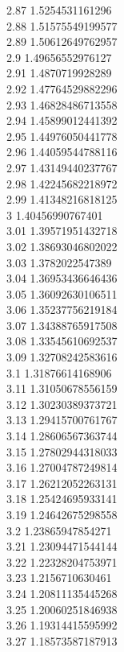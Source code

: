 {2.87	1.5254531161296\\
2.88	1.51575549199577\\
2.89	1.50612649762957\\
2.9	1.49656552976127\\
2.91	1.4870719928289\\
2.92	1.47764529882296\\
2.93	1.46828486713558\\
2.94	1.45899012441392\\
2.95	1.44976050441778\\
2.96	1.44059544788116\\
2.97	1.43149440237767\\
2.98	1.42245682218972\\
2.99	1.41348216818125\\
3	1.40456990767401\\
3.01	1.39571951432718\\
3.02	1.38693046802022\\
3.03	1.3782022547389\\
3.04	1.36953436646436\\
3.05	1.36092630106511\\
3.06	1.35237756219184\\
3.07	1.34388765917508\\
3.08	1.33545610692537\\
3.09	1.32708242583616\\
3.1	1.31876614168906\\
3.11	1.31050678556159\\
3.12	1.30230389373721\\
3.13	1.29415700761767\\
3.14	1.28606567363744\\
3.15	1.27802944318033\\
3.16	1.27004787249814\\
3.17	1.26212052263131\\
3.18	1.25424695933141\\
3.19	1.24642675298558\\
3.2	1.23865947854271\\
3.21	1.23094471544144\\
3.22	1.22328204753971\\
3.23	1.2156710630461\\
3.24	1.20811135445268\\
3.25	1.20060251846938\\
3.26	1.19314415595992\\
3.27	1.18573587187913\\
}
